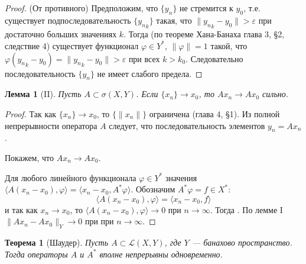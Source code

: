 \documentclass[12pt,a4paper,titlepage,oneside]{book}
\theoremstyle{definition}
\theoremstyle{plain}
\newtheorem*{theorem}{Теорема}
\theoremstyle{break}
\theoremstyle{remark}
\theoremstyle{remark}
\theoremstyle{remark}
\theoremstyle{remark}
\theoremstyle{plain}
\newtheorem*{lemma}{Лемма}
\theoremstyle{plain}
\begin{document}
\begin{proof}
(От противного) Предположим, что $\{y_n\}$ не стремится к $y_0$, т.е. существует подпоследовательность $\{{y_n}_k\}$ такая, что $\lVert {y_n}_k-y_0\rVert > \varepsilon$ при достаточно больших значениях $k$. Тогда (по теореме Хана-Банаха глава 3, \S 2, следствие 4) существует функционал $\varphi\in Y^*$, $\lVert\varphi\rVert=1$ такой, что $\varphi({y_n}_k-y_0)=\lVert {y_n}_k-y_0\rVert > \varepsilon$ при всех $k > k_0$. Следовательно последовательность $\{y_n\}$ не имеет слабого предела.
\end{proof}

\begin{lemma}[II]
Пусть $A\subset\sigma(X,Y)$. Если $\{x_n\}\to x_0$, то $Ax_n\to Ax_0$ сильно.
\end{lemma}

\begin{proof}
Так как $\{x_n\}\to x_0$, то $\{\lVert x_n\rVert\}$ ограничена (глава 4, \S 1). Из полной непрерывности оператора $A$ следует, что последовательность элементов $y_n = Ax_n$ .

Покажем, что $Ax_n\to Ax_0$.

Для любого линейного функционала $\varphi\in Y^*$ значения $ \langle A(x_n-x_0), \varphi \rangle  =  \langle x_n-x_0, A^*\varphi \rangle $. Обозначим $A^*\varphi = f\in X^*$:
\begin{equation*}
 \langle A(x_n-x_0), \varphi \rangle  =  \langle x_n-x_0, f \rangle 
\end{equation*}
и так как $x_n\to x_0$, то $ \langle A(x_n-x_0), \varphi \rangle \to 0$ при $n\to\infty$. Тогда . По лемме I $\lVert Ax_n-Ax_0\rVert_Y\to 0$ при при $n\to\infty$.
\end{proof}

\begin{theorem}[Шаудер]
Пусть $A\subset\mathcal{\mathcal{L}}(X, Y)$, где $Y$ --- банахово пространство. Тогда операторы $A$ и $A^*$ вполне непрерывны одновременно.
\end{theorem}
\end{document}
